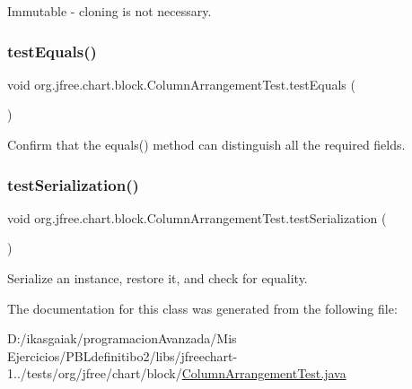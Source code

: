Immutable -\/ cloning is not necessary. \mbox{\label{classorg_1_1jfree_1_1chart_1_1block_1_1_column_arrangement_test_abb623e556c07e88175d19113348f16af}} 
\subsubsection{\texorpdfstring{test\+Equals()}{testEquals()}}
{\footnotesize\ttfamily void org.\+jfree.\+chart.\+block.\+Column\+Arrangement\+Test.\+test\+Equals (\begin{DoxyParamCaption}{ }\end{DoxyParamCaption})}

Confirm that the equals() method can distinguish all the required fields. \mbox{\label{classorg_1_1jfree_1_1chart_1_1block_1_1_column_arrangement_test_a6f3d010568e97e68f4eb272525e3e55b}} 
\subsubsection{\texorpdfstring{test\+Serialization()}{testSerialization()}}
{\footnotesize\ttfamily void org.\+jfree.\+chart.\+block.\+Column\+Arrangement\+Test.\+test\+Serialization (\begin{DoxyParamCaption}{ }\end{DoxyParamCaption})}

Serialize an instance, restore it, and check for equality. 

The documentation for this class was generated from the following file\+:\begin{DoxyCompactItemize}
\item 
D\+:/ikasgaiak/programacion\+Avanzada/\+Mis Ejercicios/\+P\+B\+Ldefinitibo2/libs/jfreechart-\/1../tests/org/jfree/chart/block/\mbox{\hyperlink{_column_arrangement_test_8java}{Column\+Arrangement\+Test.\+java}}\end{DoxyCompactItemize}

